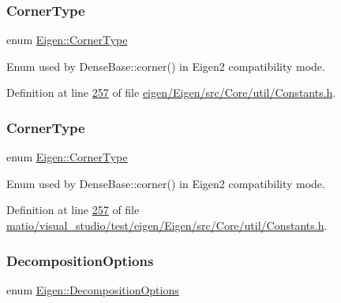 \subsubsection{\texorpdfstring{Corner\+Type}{CornerType}\hspace{0.1cm}{\footnotesize\ttfamily [1/2]}}
{\footnotesize\ttfamily enum \hyperlink{group__enums_gaafc7e22c8efbfefd5997e2cd9ec223e0}{Eigen\+::\+Corner\+Type}}

Enum used by Dense\+Base\+::corner() in Eigen2 compatibility mode. 

Definition at line \hyperlink{eigen_2_eigen_2src_2_core_2util_2_constants_8h_source_l00257}{257} of file \hyperlink{eigen_2_eigen_2src_2_core_2util_2_constants_8h_source}{eigen/\+Eigen/src/\+Core/util/\+Constants.\+h}.

\mbox{\label{group__enums_gaafc7e22c8efbfefd5997e2cd9ec223e0}} 
\subsubsection{\texorpdfstring{Corner\+Type}{CornerType}\hspace{0.1cm}{\footnotesize\ttfamily [2/2]}}
{\footnotesize\ttfamily enum \hyperlink{group__enums_gaafc7e22c8efbfefd5997e2cd9ec223e0}{Eigen\+::\+Corner\+Type}}

Enum used by Dense\+Base\+::corner() in Eigen2 compatibility mode. 

Definition at line \hyperlink{matio_2visual__studio_2test_2eigen_2_eigen_2src_2_core_2util_2_constants_8h_source_l00257}{257} of file \hyperlink{matio_2visual__studio_2test_2eigen_2_eigen_2src_2_core_2util_2_constants_8h_source}{matio/visual\+\_\+studio/test/eigen/\+Eigen/src/\+Core/util/\+Constants.\+h}.

\mbox{\label{group__enums_gae3e239fb70022eb8747994cf5d68b4a9}} 
\subsubsection{\texorpdfstring{Decomposition\+Options}{DecompositionOptions}\hspace{0.1cm}{\footnotesize\ttfamily [1/2]}}
{\footnotesize\ttfamily enum \hyperlink{group__enums_gae3e239fb70022eb8747994cf5d68b4a9}{Eigen\+::\+Decomposition\+Options}}


